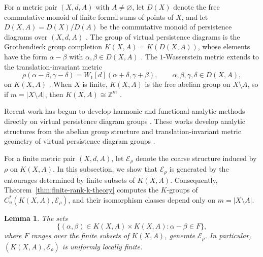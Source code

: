 \documentclass[pdflatex,sn-mathphys-num]{sn-jnl}%
\theoremstyle{plain}
\newtheorem{lemma}[theorem]{Lemma}
\theoremstyle{remark}
\theoremstyle{definition}
\numberwithin{equation}{section}
\begin{document}
For a metric pair \( (X,d,A) \) with \( A\neq\varnothing \), let \( D(X) \) denote the free commutative monoid of finite formal sums of points of \( X \), and let \( D(X,A)=D(X)/D(A) \) be the commutative monoid of persistence diagrams over \( (X,d,A) \) \cite[Sections~2.2--2.3]{bubenik2022virtual}. The group of virtual persistence diagrams is the Grothendieck group completion \( K(X,A)=K(D(X,A)) \), whose elements have the form \( \alpha-\beta \) with \( \alpha,\beta\in D(X,A) \) \cite[Section~2.5 and Definition~4.10]{bubenik2022virtual}. The \( 1 \)-Wasserstein metric extends to the translation-invariant metric
\[
\rho(\alpha-\beta,\gamma-\delta)
=
W_1[d](\alpha+\delta,\gamma+\beta),
\qquad
\alpha,\beta,\gamma,\delta\in D(X,A),
\]
on \( K(X,A) \) \cite[Corollary~4.9 and Definition~4.10]{bubenik2022virtual}. When \( X \) is finite, \( K(X,A) \) is the free abelian group on \( X\setminus A \), so if \( m=|X\setminus A| \), then \( K(X,A)\cong\mathbb Z^m \) \cite[Definition~4.10 and the subsequent paragraph]{bubenik2022virtual}.

Recent work has begun to develop harmonic and functional-analytic methods directly on virtual persistence diagram groups \cite{fanningaktas2025rkhsvpd, fanningaktas2026banachrkhs, fanningaktas2026randomwalks}. These works develop analytic structures from the abelian group structure and translation-invariant metric geometry of virtual persistence diagram groups \cite{fanningaktas2025rkhsvpd, fanningaktas2026banachrkhs, fanningaktas2026randomwalks}.

For a finite metric pair \( (X,d,A) \), let \( \mathcal E_\rho \) denote the coarse structure induced by \( \rho \) on \( K(X,A) \). In this subsection, we show that \( \mathcal E_\rho \) is generated by the entourages determined by finite subsets of \( K(X,A) \). Consequently, Theorem~\ref{thm:finite-rank-k-theory} computes the \( K \)-groups of \( C_u^*(K(X,A),\mathcal E_\rho) \), and their isomorphism classes depend only on \( m=|X\setminus A| \).

\begin{lemma}
\label{lem:virtual-persistence-coarse-structure}
The sets
\[
\{(\alpha,\beta)\in K(X,A)\times K(X,A):\alpha-\beta\in F\},
\]
where \( F \) ranges over the finite subsets of \( K(X,A) \), generate \( \mathcal E_\rho \). In particular, \( (K(X,A),\mathcal E_\rho) \) is uniformly locally finite.
\end{lemma}
\end{document}
